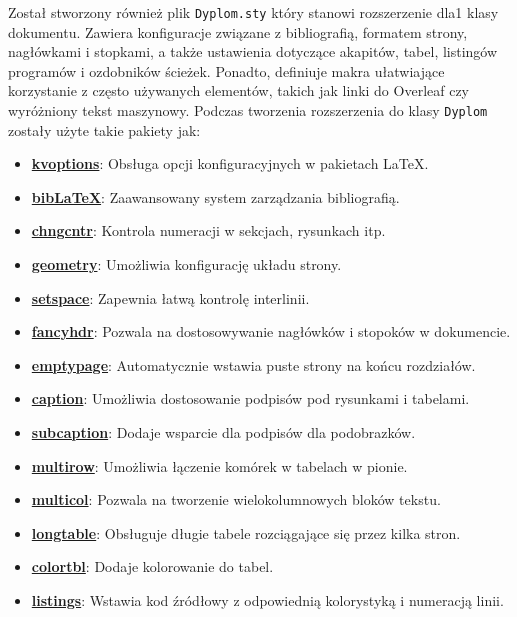 Został stworzony również plik \texttt{Dyplom.sty} który stanowi rozszerzenie dla1 klasy dokumentu. Zawiera konfiguracje związane z bibliografią, formatem strony, nagłówkami i stopkami, a także ustawienia dotyczące akapitów, tabel, listingów programów i ozdobników ścieżek. Ponadto, definiuje makra ułatwiające korzystanie z często używanych elementów, takich jak linki do Overleaf czy wyróżniony tekst maszynowy. Podczas tworzenia rozszerzenia do klasy \texttt{Dyplom} zostały użyte takie pakiety jak:
\begin{itemize} 
\item \href{https://www.ctan.org/pkg/kvoptions}{\textbf{kvoptions}}: Obsługa opcji konfiguracyjnych w pakietach LaTeX.
\item \href{https://www.ctan.org/pkg/biblatex}{\textbf{bibLaTeX}}: Zaawansowany system zarządzania bibliografią.
\item \href{https://www.ctan.org/pkg/chngcntr}{\textbf{chngcntr}}: Kontrola numeracji w sekcjach, rysunkach itp.
\item \href{https://www.ctan.org/pkg/geometry}{\textbf{geometry}}: Umożliwia konfigurację układu strony.
\item \href{https://www.ctan.org/pkg/setspace}{\textbf{setspace}}: Zapewnia łatwą kontrolę interlinii.
\item \href{https://www.ctan.org/pkg/fancyhdr}{\textbf{fancyhdr}}: Pozwala na dostosowywanie nagłówków i stopoków w dokumencie.
\item \href{https://www.ctan.org/pkg/emptypage}{\textbf{emptypage}}: Automatycznie wstawia puste strony na końcu rozdziałów.
\item \href{https://www.ctan.org/pkg/caption}{\textbf{caption}}: Umożliwia dostosowanie podpisów pod rysunkami i tabelami.
\item \href{https://www.ctan.org/pkg/subcaption}{\textbf{subcaption}}: Dodaje wsparcie dla podpisów dla podobrazków.
\item \href{https://www.ctan.org/pkg/multirow}{\textbf{multirow}}: Umożliwia łączenie komórek w tabelach w pionie.
\item \href{https://www.ctan.org/pkg/multicol}{\textbf{multicol}}: Pozwala na tworzenie wielokolumnowych bloków tekstu.
\item \href{https://www.ctan.org/pkg/longtable}{\textbf{longtable}}: Obsługuje długie tabele rozciągające się przez kilka stron.
\item \href{https://www.ctan.org/pkg/colortbl}{\textbf{colortbl}}: Dodaje kolorowanie do tabel.
\item \href{https://www.ctan.org/pkg/listings}{\textbf{listings}}: Wstawia kod źródłowy z odpowiednią kolorystyką i numeracją linii.

\end{itemize}
